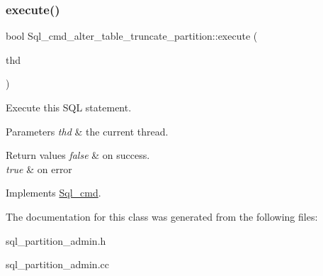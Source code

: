 \subsubsection{\texorpdfstring{execute()}{execute()}}
{\footnotesize\ttfamily bool Sql\+\_\+cmd\+\_\+alter\+\_\+table\+\_\+truncate\+\_\+partition\+::execute (\begin{DoxyParamCaption}\item[{T\+HD $\ast$}]{thd }\end{DoxyParamCaption})\hspace{0.3cm}{\ttfamily [virtual]}}

Execute this S\+QL statement. 
\begin{DoxyParams}{Parameters}
{\em thd} & the current thread. \\
\hline
\end{DoxyParams}

\begin{DoxyRetVals}{Return values}
{\em false} & on success. \\
\hline
{\em true} & on error \\
\hline
\end{DoxyRetVals}


Implements \mbox{\hyperlink{classSql__cmd_a213367b79b551296fbb7790f2a3732fb}{Sql\+\_\+cmd}}.



The documentation for this class was generated from the following files\+:\begin{DoxyCompactItemize}
\item 
sql\+\_\+partition\+\_\+admin.\+h\item 
sql\+\_\+partition\+\_\+admin.\+cc\end{DoxyCompactItemize}
